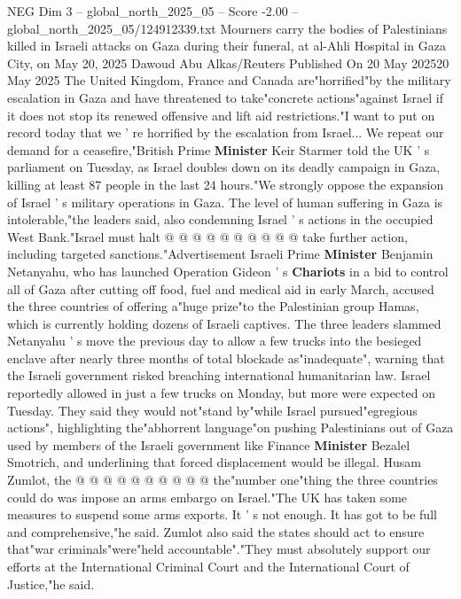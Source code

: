 \begin{textsample}{NEG Dim 3 – global\_north\_2025\_05 – Score -2.00 – global\_north\_2025\_05/124912339.txt}  \label{ex:f3_neg_311}
Mourners carry the bodies of Palestinians killed in Israeli attacks on Gaza during their funeral, at al-Ahli Hospital in Gaza City, on May 20, 2025 Dawoud Abu Alkas/Reuters Published On 20 May 202520 May 2025 The United Kingdom, France and Canada are"horrified"by the military escalation in Gaza and have threatened to take"concrete actions"against Israel if it does not stop its renewed offensive and lift aid restrictions."I want to put on record today that we ' re horrified by the escalation from Israel...
We repeat our demand for a ceasefire,"British Prime \textbf{Minister} Keir Starmer told the UK ' s parliament on Tuesday, as Israel doubles down on its deadly campaign in Gaza, killing at least 87 people in the last 24 hours."We strongly oppose the expansion of Israel ' s military operations in Gaza.
The level of human suffering in Gaza is intolerable,"the leaders said, also condemning Israel ' s actions in the occupied West Bank."Israel must halt @ @ @ @ @ @ @ @ @ @ take further action, including targeted sanctions."Advertisement Israeli Prime \textbf{Minister} Benjamin Netanyahu, who has launched Operation Gideon ' s \textbf{Chariots} in a bid to control all of Gaza after cutting off food, fuel and medical aid in early March, accused the three countries of offering a"huge prize"to the Palestinian group Hamas, which is currently holding dozens of Israeli captives.
The three leaders slammed Netanyahu ' s move the previous day to allow a few trucks into the besieged enclave after nearly three months of total blockade as"inadequate", warning that the Israeli government risked breaching international humanitarian law.
Israel reportedly allowed in just a few trucks on Monday, but more were expected on Tuesday.
They said they would not"stand by"while Israel pursued"egregious actions", highlighting the"abhorrent language"on pushing Palestinians out of Gaza used by members of the Israeli government like Finance \textbf{Minister} Bezalel Smotrich, and underlining that forced displacement would be illegal.
Husam Zumlot, the @ @ @ @ @ @ @ @ @ @ the"number one"thing the three countries could do was impose an arms embargo on Israel."The UK has taken some measures to suspend some arms exports.
It ' s not enough.
It has got to be full and comprehensive,"he said.
Zumlot also said the states should act to ensure that"war criminals"were"held accountable"."They must absolutely support our efforts at the International Criminal Court and the International Court of Justice,"he said.

\end{textsample}
